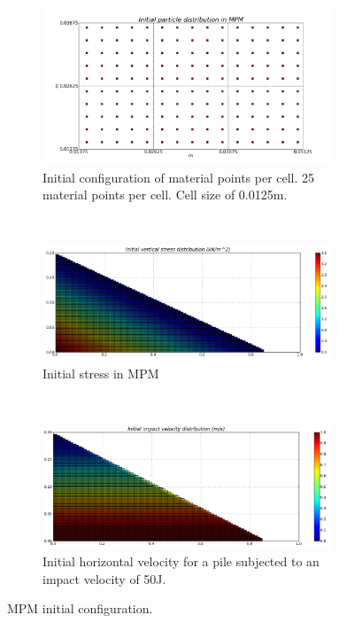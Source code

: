 \begin{figure}[tbhp]
\centering
\begin{subfigure}[t]{0.75\textwidth}
\centering
\includegraphics[width=0.95\textwidth]{MPM_Initial_PIC_Slope}
\caption{Initial configuration of material points per cell. 25 material points 
per cell. Cell size of 0.0125m.}
\label{fig:MPM_Initial_PIC_Slope}
\end{subfigure} \\
%
\begin{subfigure}[t]{0.95\textwidth}
\centering
\includegraphics[width=0.95\textwidth]{MPM_Stress_Slope}
\caption{Initial stress in MPM}
\label{fig:MPM_Stress_Slope}
\end{subfigure} \\
%
\begin{subfigure}[t]{0.95\textwidth}
\centering
\includegraphics[width=0.95\textwidth]{MPM_Velocity_Slope}
\caption{Initial horizontal velocity for a pile subjected to an impact velocity 
of 50J.}
\label{fig:MPM_Velocity_Slope}
\end{subfigure}
\caption{MPM initial configuration.}
\label{fig:MPM_Slope_setup}
\end{figure}


